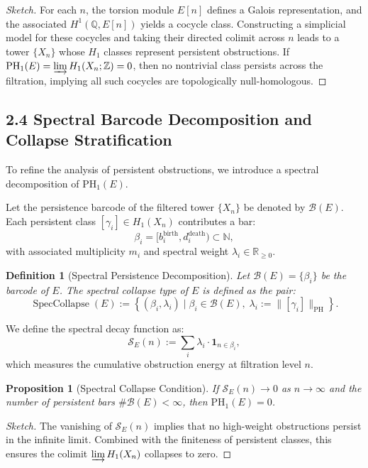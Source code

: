 \documentclass[11pt]{article}
\newtheorem{definition}[theorem]{Definition}
\newtheorem{proposition}[theorem]{Proposition}
\begin{document}
\begin{proof}[Sketch]
For each $n$, the torsion module $E[n]$ defines a Galois representation, and the associated $H^1(\mathbb{Q},E[n])$ yields a cocycle class.  
Constructing a simplicial model for these cocycles and taking their directed colimit across $n$ leads to a tower $\{X_n\}$ whose $H_1$ classes represent persistent obstructions.  
If $\mathrm{PH}_1(E) = \varinjlim H_1(X_n;\mathbb{Z}) = 0$, then no nontrivial class persists across the filtration, implying all such cocycles are topologically null-homologous.
\end{proof}

\subsection{2.4 Spectral Barcode Decomposition and Collapse Stratification}

To refine the analysis of persistent obstructions, we introduce a spectral decomposition of $\mathrm{PH}_1(E)$.

Let the persistence barcode of the filtered tower $\{X_n\}$ be denoted by $\mathcal{B}(E)$. Each persistent class $[\gamma_i] \in H_1(X_n)$ contributes a bar:
\[
\beta_i = [b_i^{\text{birth}}, d_i^{\text{death}}) \subset \mathbb{N},
\]
with associated multiplicity $m_i$ and spectral weight $\lambda_i \in \mathbb{R}_{\geq 0}$.

\begin{definition}[Spectral Persistence Decomposition]
Let $\mathcal{B}(E) = \{\beta_i\}$ be the barcode of $E$. The spectral collapse type of $E$ is defined as the pair:
\[
\operatorname{SpecCollapse}(E) := \left\{ (\beta_i, \lambda_i) \mid \beta_i \in \mathcal{B}(E),\; \lambda_i := \|[\gamma_i]\|_{\text{PH}} \right\}.
\]
\end{definition}

We define the spectral decay function as:
\[
\mathcal{S}_E(n) := \sum_{i} \lambda_i \cdot \mathbf{1}_{n \in \beta_i},
\]
which measures the cumulative obstruction energy at filtration level $n$.

\begin{proposition}[Spectral Collapse Condition]
If $\mathcal{S}_E(n) \to 0$ as $n \to \infty$ and the number of persistent bars $\#\mathcal{B}(E) < \infty$, then $\mathrm{PH}_1(E) = 0$.
\end{proposition}

\begin{proof}[Sketch]
The vanishing of $\mathcal{S}_E(n)$ implies that no high-weight obstructions persist in the infinite limit. Combined with the finiteness of persistent classes, this ensures the colimit $\varinjlim H_1(X_n)$ collapses to zero.
\end{proof}
\end{document}

